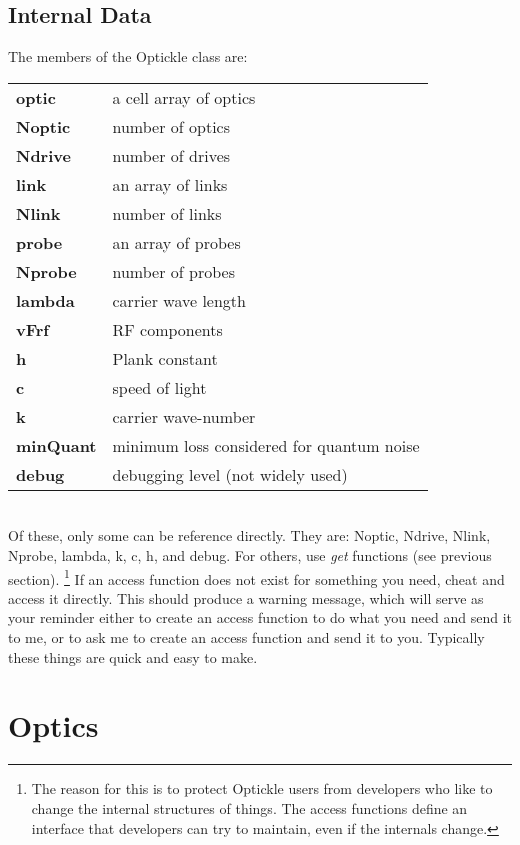 \documentclass[12pt]{article}
\begin{document}
\subsection{Internal Data}

The members of the Optickle class are:

\begin{tabular}{ll}
  \textbf{optic} & a cell array of optics \\
  \textbf{Noptic} & number of optics \\
  \textbf{Ndrive} & number of drives \\
  \textbf{link} & an array of links \\
  \textbf{Nlink} & number of links \\
  \textbf{probe} & an array of probes \\
  \textbf{Nprobe} & number of probes \\
  \textbf{lambda} & carrier wave length \\
  \textbf{vFrf} & RF components \\
  \textbf{h} & Plank constant \\
  \textbf{c} &speed of light \\
  \textbf{k} & carrier wave-number \\
  \textbf{minQuant} & minimum loss considered for quantum noise \\
  \textbf{debug} & debugging level (not widely used) \\
\end{tabular}\\
Of these, only some can be reference directly.
They are:  Noptic, Ndrive, Nlink, Nprobe, lambda, k, c, h, and debug.
For others, use {\it get} functions (see previous section).
\footnote{The reason for this is to protect Optickle users
from developers who like to change the internal structures of things.
The access functions define an interface that developers can try to maintain, even if the internals change.}
If an access function does not exist for something you need, cheat and access it directly.
This should produce a warning message, which will serve as your reminder either to create an access function to do what you need and send it to me, or to ask me to create an access function and send it to you.
Typically these things are quick and easy to make.

\section{Optics}
\end{document}
